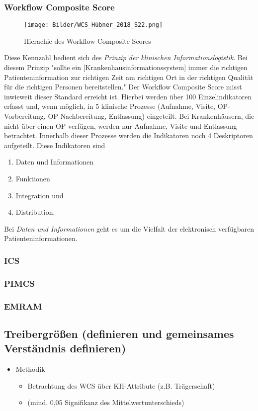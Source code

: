 	\subsubsection{Workflow Composite Score}
		\begin{figure}[h]
			\centering
			\texttt{[image: Bilder/WCS\_Hübner\_2018\_S22.png]}
			\caption{Hierachie des Workflow Composite Scores \parencite[22]{huebner2018}}
			\label{fig:WCS}
		\end{figure}
		Diese Kennzahl bedient sich des \textit{Prinzip der klinischen Informationslogistik}. Bei diesem Prinzip "sollte ein [Krankenhausinformationssystem] immer die richtigen Patienteninformation zur richtigen Zeit am richtigen Ort in der richtigen Qualität für die richtigen Personen bereitstellen."\parencite[36]{huebner2019} Der Workflow Composite Score misst inwieweit dieser Standard erreicht ist. Hierbei werden über 100 Einzelindikatoren erfasst und, wenn möglich, in 5 klinische Prozesse (Aufnahme, Visite, OP-Vorbereitung, OP-Nachbereitung, Entlassung) eingeteilt. Bei Krankenhäusern, die nicht über einen OP verfügen, werden nur Aufnahme, Visite und Entlassung betrachtet. Innerhalb dieser Prozesse werden die Indikatoren noch 4 Deskriptoren aufgeteilt. Diese Indikatoren sind
		\begin{enumerate}
			\item Daten und Informationen
			\item Funktionen
			\item Integration und
			\item Distribution.
		\end{enumerate}
		Bei \textit{Daten und Informationen} geht es um die Vielfalt der elektronisch verfügbaren Patienteninformationen. 
	\subsubsection{ICS}
	\subsubsection{PIMCS}
	\subsubsection{EMRAM}
	\parencite{Stephani2019}
	\subsection{Treibergrößen (definieren und gemeinsames Verständnis definieren)}
	\begin{itemize}
		\item Methodik
		\begin{itemize}
			\item Betrachtung des WCS über KH-Attribute (z.B. Trägerschaft)
			\item (mind. 0,05 Signifikanz des Mittelwertunterschieds)
		\end{itemize}
	\end{itemize}
